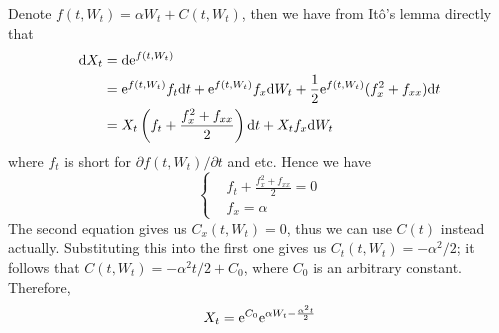 \documentclass{homework}
\begin{document}
    \problem
    Denote $f(t,W_t)=\alpha W_t+C(t,W_t)$, then we have from
    It\^o's lemma directly that
    \[\begin{aligned}
        \mathrm d X_t&=\mathrm d \mathrm e^{f(t,W_t)}\\
        &=\mathrm e^{f(t,W_t)}f_t\mathrm d t+\mathrm e^{f(t,W_t)}f_x\mathrm d W_t
        +\frac{1}{2}\mathrm e^{f(t,W_t)}(f_x^2+f_{xx})\mathrm d t\\
        &=X_t\left(f_t+\frac{f_x^2+f_{xx}}{2}\right)\mathrm d t
        +X_tf_x\mathrm d W_t
    \end{aligned}\]
    where $f_t$ is short for $\partial f(t,W_t)/\partial t$ and etc.
    Hence we have
    \[\left\{\begin{aligned}
        &f_t+\frac{f_x^2+f_{xx}}{2}=0\\
        &f_x=\alpha
    \end{aligned}\right.\]
    The second equation gives us $C_x(t,W_t)=0$, thus we can use $C(t)$
    instead actually. Substituting this into the first one gives us
    $C_t(t,W_t)=-\alpha^2/2$; it follows that $C(t,W_t)=-\alpha^2 t/2+C_0$,
    where $C_0$ is an arbitrary constant.
    Therefore,
    \[X_t=\mathrm e^{C_0}\mathrm e^{\alpha W_t-\frac{\alpha^2t}{2}}\]
\end{document}
